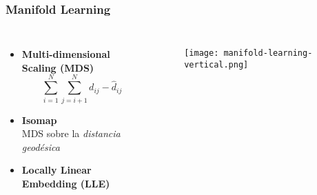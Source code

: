 \begin{frame}
    \frametitle{Manifold Learning}

    \begin{columns}

        \begin{itemize}
            \item<2-> \textbf{Multi-dimensional Scaling (MDS)}
            \begin{equation*}
                \sum_{i=1}^{N}\sum_{j=i+1}^{N}{d_{ij} - \hat{d}_{ij}}
            \end{equation*}
            \item<3-> \textbf{Isomap} \\
            MDS sobre la \textit{distancia geodésica}
            \item<4-> \textbf{Locally Linear Embedding (LLE)}
        \end{itemize}


        \begin{figure}[!h]
            \centering
            \texttt{[image: manifold-learning-vertical.png]}
        \end{figure}

    \end{columns}
\end{frame}